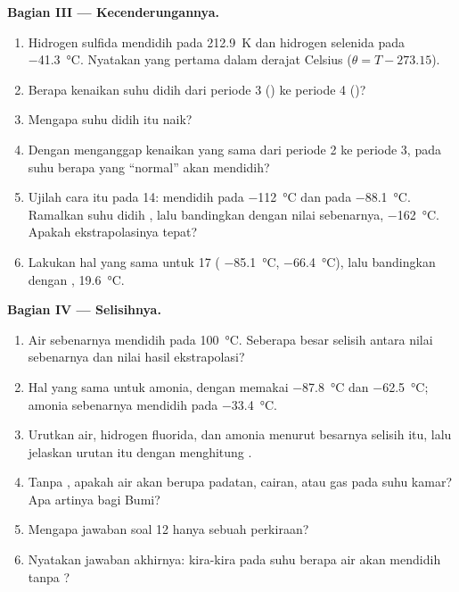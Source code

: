 \begin{problem}
\medskip
\noindent\textbf{Bagian III --- Kecenderungannya.}
\begin{enumerate}[resume]
  \item Hidrogen sulfida mendidih pada \qty{212.9}{K} dan hidrogen
        selenida pada \qty{-41.3}{\celsius}. Nyatakan yang pertama dalam
        derajat Celsius ($\theta = T - 273.15$).
  \item Berapa kenaikan suhu didih dari periode 3 () ke periode 4
        ()?
  \item Mengapa suhu didih itu naik?
  \item Dengan menganggap kenaikan yang sama dari periode 2 ke periode 3,
        pada suhu berapa  yang ``normal'' akan mendidih?
  \item Ujilah cara itu pada  14:  mendidih pada
        \qty{-112}{\celsius} dan  pada \qty{-88.1}{\celsius}.
        Ramalkan suhu didih , lalu bandingkan dengan nilai
        sebenarnya, \qty{-162}{\celsius}. Apakah ekstrapolasinya tepat?
  \item Lakukan hal yang sama untuk  17 (
        \qty{-85.1}{\celsius},  \qty{-66.4}{\celsius}), lalu
        bandingkan dengan , \qty{19.6}{\celsius}.
\end{enumerate}

\medskip
\noindent\textbf{Bagian IV --- Selisihnya.}
\begin{enumerate}[resume]
  \item Air sebenarnya mendidih pada \qty{100}{\celsius}. Seberapa besar
        selisih antara nilai sebenarnya dan nilai hasil ekstrapolasi?
  \item Hal yang sama untuk amonia, dengan memakai 
        \qty{-87.8}{\celsius} dan  \qty{-62.5}{\celsius}; amonia
        sebenarnya mendidih pada \qty{-33.4}{\celsius}.
  \item Urutkan air, hidrogen fluorida, dan amonia menurut besarnya
        selisih itu, lalu jelaskan urutan itu dengan menghitung .
  \item Tanpa , apakah air akan berupa padatan, cairan,
        atau gas pada suhu kamar? Apa artinya bagi Bumi?
  \item Mengapa jawaban soal 12 hanya sebuah perkiraan?
  \item Nyatakan jawaban akhirnya: kira-kira pada suhu berapa air akan
        mendidih tanpa ?
\end{enumerate}
\end{problem}

